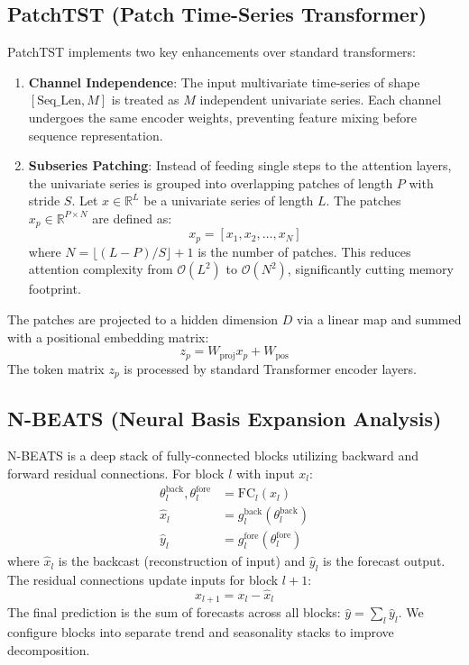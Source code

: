 \documentclass[11pt,journal,onecolumn]{IEEEtran}
\begin{document}
\subsection{PatchTST (Patch Time-Series Transformer)}
PatchTST implements two key enhancements over standard transformers:
\begin{enumerate}
    \item \textbf{Channel Independence}: The input multivariate time-series of shape $[\text{Seq\_Len}, M]$ is treated as $M$ independent univariate series. Each channel undergoes the same encoder weights, preventing feature mixing before sequence representation.
    \item \textbf{Subseries Patching}: Instead of feeding single steps to the attention layers, the univariate series is grouped into overlapping patches of length $P$ with stride $S$. Let $x \in \mathbb{R}^L$ be a univariate series of length $L$. The patches $x_p \in \mathbb{R}^{P \times N}$ are defined as:
    \begin{equation}
    x_p = [x_1, x_2, \dots, x_N]
    \end{equation}
    where $N = \lfloor (L - P)/S \rfloor + 1$ is the number of patches. This reduces attention complexity from $\mathcal{O}(L^2)$ to $\mathcal{O}(N^2)$, significantly cutting memory footprint.
\end{enumerate}

The patches are projected to a hidden dimension $D$ via a linear map and summed with a positional embedding matrix:
\begin{equation}
z_p = W_{\text{proj}} x_p + W_{\text{pos}}
\end{equation}
The token matrix $z_p$ is processed by standard Transformer encoder layers.

\subsection{N-BEATS (Neural Basis Expansion Analysis)}
N-BEATS is a deep stack of fully-connected blocks utilizing backward and forward residual connections. For block $l$ with input $x_l$:
\begin{align}
\theta_l^{\text{back}}, \theta_l^{\text{fore}} &= \text{FC}_l(x_l) \\
\hat{x}_l &= g_l^{\text{back}}(\theta_l^{\text{back}}) \\
\hat{y}_l &= g_l^{\text{fore}}(\theta_l^{\text{fore}})
\end{align}
where $\hat{x}_l$ is the backcast (reconstruction of input) and $\hat{y}_l$ is the forecast output. The residual connections update inputs for block $l+1$:
\begin{equation}
x_{l+1} = x_l - \hat{x}_l
\end{equation}
The final prediction is the sum of forecasts across all blocks: $\hat{y} = \sum_l \hat{y}_l$. We configure blocks into separate trend and seasonality stacks to improve decomposition.
\end{document}

